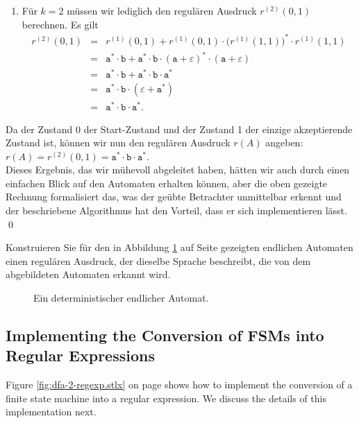 \begin{enumerate}
\item F\"ur $k=2$ m\"ussen wir lediglich den regul\"aren Ausdruck $r^{(2)}(0, 1)$ berechnen.  Es gilt
            \begin{eqnarray*}
                  r^{(2)}(0, 1)
            & = & r^{(1)}(0, 1) + 
                  r^{(1)}(0, 1) \cdot \bigl(r^{(1)}(1, 1)\bigr)^* \cdot r^{(1)}(1, 1) \\
            & = & \texttt{a}^* \cdot \texttt{b} + 
                  \texttt{a}^* \cdot \texttt{b} \cdot (\texttt{a} + \varepsilon)^* \cdot (\texttt{a} + \varepsilon) \\
            & = & \texttt{a}^* \cdot \texttt{b} + \texttt{a}^* \cdot \texttt{b} \cdot \texttt{a}^* \\
            & = & \texttt{a}^* \cdot \texttt{b} \cdot (\varepsilon + \texttt{a}^*) \\
            & = & \texttt{a}^* \cdot \texttt{b} \cdot \texttt{a}^*.
        \end{eqnarray*}
\end{enumerate}
Da der Zustand 0 der Start-Zustand und der Zustand 1 der einzige akzeptierende Zustand
ist, k\"onnen wir nun den regul\"aren Ausdruck $r(A)$ angeben: 
\\[0.2cm]
\hspace*{1.3cm}
$r(A) = r^{(2)}(0, 1) = \texttt{a}^* \cdot \texttt{b} \cdot \texttt{a}^*$.
\\[0.2cm]
Dieses Ergebnis, das wir m\"uhevoll abgeleitet haben, h\"atten wir auch durch einen einfachen
Blick auf den Automaten erhalten k\"onnen, aber die oben gezeigte Rechnung formalisiert das,
was der ge\"ubte Betrachter unmittelbar erkennt und der beschriebene Algorithmus hat den
Vorteil, dass er sich implementieren l\"asst.
\qed

\exercise
Konstruieren Sie f\"ur den in Abbildung \ref{fig:exercise-13.eps} auf Seite
\pageref{fig:exercise-13.eps} gezeigten endlichen Automaten einen
regul\"aren Ausdruck, der dieselbe Sprache beschreibt, die von dem abgebildeten Automaten erkannt
wird.   

\begin{figure}[!ht]
  \centering
{}
\caption{Ein deterministischer endlicher Automat.}
\label{fig:exercise-13.eps}
\end{figure}


\subsection{Implementing the Conversion of \textsc{FSM}s into Regular Expressions}
Figure \ref{fig:dfa-2-regexp.stlx} on page \pageref{fig:dfa-2-regexp.stlx} shows how to
implement the conversion of a finite state machine  into a regular expression.  We discuss
the details of this implementation next.

